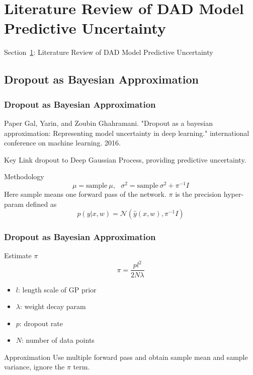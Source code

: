 \documentclass{beamer}
\begin{document}
\section{Literature Review of DAD Model Predictive Uncertainty}
\label{sec-review}
\begin{frame}
\centerline{Section~\ref{sec-review}: Literature Review of DAD Model Predictive Uncertainty}
\end{frame}


\subsection{Dropout as Bayesian Approximation}
\begin{frame}
\frametitle{Dropout as Bayesian Approximation}
\begin{block}{Paper}
Gal, Yarin, and Zoubin Ghahramani. "Dropout as a bayesian approximation: Representing model uncertainty in deep learning." international conference on machine learning. 2016.
\end{block}

\begin{block}{Key}
Link dropout to Deep Gaussian Process, providing predictive uncertainty.
\end{block}

\begin{block}{Methodology}
\[
\mu = \text{sample} \ \mu, \ \ \ \sigma^2 = \text{sample} \ \sigma^2 + \pi^{-1}I
\]
Here sample means one forward pass of the network. $\pi$ is the precision hyper-param defined as
\[
p(y|x,w) = \mathcal{N}(\hat{y}(x,w), \pi^{-1}I)
\]
\end{block}

\end{frame}

\begin{frame}
\frametitle{Dropout as Bayesian Approximation}
\begin{block}{Estimate $\pi$}
\[
\pi = \frac{pl^2}{2N\lambda}
\]
\begin{itemize}
\setlength\itemsep{0em}
\item $l$: length scale of GP prior
\item $\lambda$: weight decay param
\item $p$: dropout rate
\item $N$: number of data points
\end{itemize}
\end{block}

\begin{block}{Approximation}
Use multiple forward pass and obtain sample mean and sample variance, ignore the $\pi$ term.
\end{block}

\end{frame}
\end{document}
